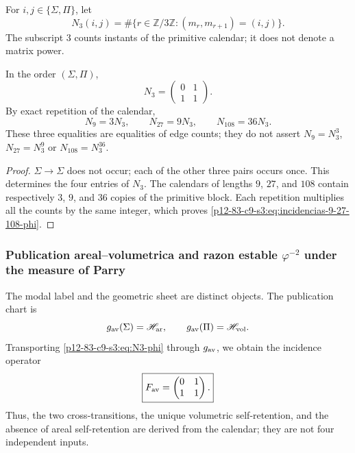 \begin{definition}
For \(i,j\in\{\Sigma,\Pi\}\), let
\[
 N_3(i,j)=
 \#\{r\in\mathbb Z/3\mathbb Z:(m_r,m_{r+1})=(i,j)\}.
\]
The subscript \(3\) counts instants of the primitive calendar; it does not denote a
matrix power.
\end{definition}

\begin{theorem}
\label{p12-83-c9-s3:thm:descenso-incidencia-modal-phi}
In the order \((\Sigma,\Pi)\),
\begin{equation}
 \boxed{
 N_3=
 \begin{pmatrix}
 0&1\\
 1&1
 \end{pmatrix}.}
 \label{p12-83-c9-s3:eq:N3-phi}
\end{equation}
By exact repetition of the calendar,
\begin{equation}
 \boxed{
 N_9=3N_3,
 \qquad
 N_{27}=9N_3,
 \qquad
 N_{108}=36N_3.}
 \label{p12-83-c9-s3:eq:incidencias-9-27-108-phi}
\end{equation}
These three equalities are equalities of edge counts; they do not assert
\(N_9=N_3^3\), \(N_{27}=N_3^9\) or \(N_{108}=N_3^{36}\).
\end{theorem}

\begin{proof}
\(\Sigma\to\Sigma\) does not occur; each of the other three pairs occurs
once. This determines the four entries of \(N_3\). The calendars of
lengths \(9\), \(27\), and \(108\) contain respectively \(3\), \(9\),
and \(36\) copies of the primitive block. Each repetition multiplies all the
counts by the same integer, which proves
\eqref{p12-83-c9-s3:eq:incidencias-9-27-108-phi}.
\end{proof}

\subsubsection{Publication areal–volumetrica and razon estable \(\varphi^{-2}\) under the measure of Parry}

The modal label and the geometric sheet are distinct objects. The publication chart is
\[
 \mathfrak g_{\rm av}(\Sigma)=\mathscr H_{\rm ar},
 \qquad
 \mathfrak g_{\rm av}(\Pi)=\mathscr H_{\rm vol}.
\]
Transporting \eqref{p12-83-c9-s3:eq:N3-phi} through \(\mathfrak g_{\rm av}\), we obtain
the incidence operator
\begin{equation}
 \boxed{
 F_{\rm av}=
 \begin{pmatrix}
 0&1\\
 1&1
 \end{pmatrix}.}
 \label{p12-83-c9-s3:eq:Fav-derivada-phi}
\end{equation}
Thus, the two cross-transitions, the unique volumetric self-retention, and the
absence of areal self-retention are derived from the calendar; they are not four
independent inputs.

